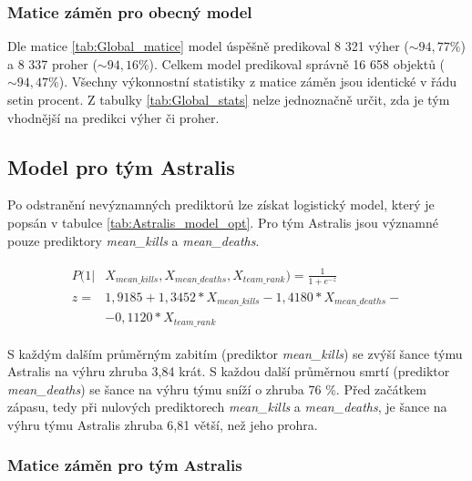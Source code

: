 \subsubsection{Matice záměn pro obecný model}





Dle matice \ref{tab:Global_matice} model úspěšně predikoval 8 321 výher ($\sim 94,77 \%$) a 8 337 proher ($\sim 94,16 \%$). Celkem
model predikoval správně 16 658 objektů ($\sim 94,47 \%$). Všechny výkonnostní statistiky z matice záměn jsou identické v řádu setin procent.
Z tabulky \ref{tab:Global_stats} nelze jednoznačně určit, zda je tým vhodnější na predikci výher či proher.

\subsection{Model pro tým Astralis}



Po odstranění nevýznamných prediktorů lze získat logistický model, který je popsán v tabulce \ref{tab:Astralis_model_opt}. Pro tým Astralis jsou významné pouze prediktory
\textit{mean\_kills} a \textit{mean\_deaths}. 

\begin{align}
    \begin{split}
        P(1 | &X_{mean\_kills}, X_{mean\_deaths}, X_{team\_rank}) = \frac{1}{1 + e^{-z}} \\
        z =   &1,9185 + 1,3452*X_{mean\_kills} - 1,4180*X_{mean\_deaths} -\\
              &- 0,1120*X_{team\_rank}
    \end{split}
\end{align}

S každým dalším průměrným zabitím (prediktor \textit{mean\_kills}) se zvýší šance týmu Astralis na výhru zhruba 3,84 krát. S každou další průměrnou smrtí (prediktor \textit{mean\_deaths})
se šance na výhru týmu sníží o zhruba 76 \%. Před začátkem zápasu, tedy při nulových prediktorech \textit{mean\_kills} a \textit{mean\_deaths}, je šance na výhru týmu Astralis zhruba 
6,81 větší, než jeho prohra.

\subsubsection{Matice záměn pro tým Astralis}

